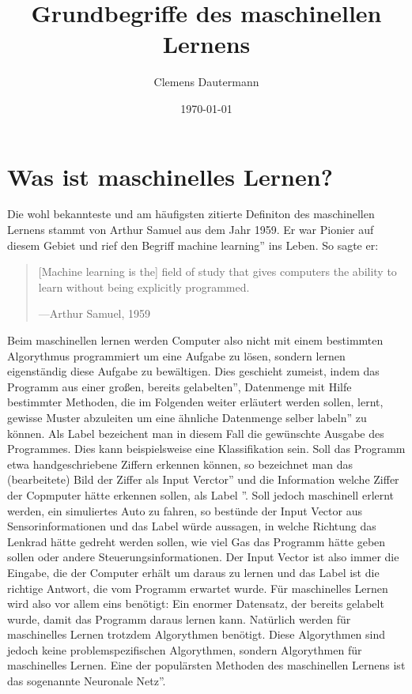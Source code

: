 \documentclass{article}
\author{Clemens Dautermann}
\title{\Huge Grundbegriffe des maschinellen Lernens}
\date{\today{}}
\begin{document}
\biolinum
{}
\begin{titlepage}
	\maketitle
\end{titlepage}
\tableofcontents{}
\newpage

\section{Was ist maschinelles Lernen?}
Die wohl bekannteste und am häufigsten zitierte Definiton des maschinellen Lernens stammt von Arthur Samuel aus dem Jahr 1959. Er war Pionier auf diesem Gebiet und rief den Begriff \glqq machine learning'' ins Leben. So sagte er:
\begin{quote}
	[Machine learning is the] field of study that gives computers the ability to learn without being explicitly programmed\cite{1}.
	\begin{flushright}
		---Arthur Samuel, 1959
	\end{flushright}
\end{quote}
Beim maschinellen lernen werden Computer also nicht mit einem bestimmten Algorythmus programmiert um eine Aufgabe zu lösen, sondern lernen eigenständig diese Aufgabe zu bewältigen. Dies geschieht zumeist, indem das Programm aus einer großen, bereits \glqq gelabelten'', Datenmenge mit Hilfe bestimmter Methoden, die im Folgenden weiter erläutert werden sollen, lernt, gewisse Muster abzuleiten um eine ähnliche Datenmenge selber \glqq labeln'' zu können.  Als Label bezeichent man in diesem Fall die gewünschte Ausgabe des Programmes. Dies kann beispielsweise eine Klassifikation sein. Soll das Programm etwa handgeschriebene Ziffern erkennen können, so bezeichnet man das (bearbeitete) Bild der Ziffer als \glqq Input Verctor'' und die Information welche Ziffer der Copmputer hätte erkennen sollen, als \glqq Label ''. Soll jedoch maschinell erlernt werden, ein simuliertes Auto zu fahren, so bestünde der Input Vector aus Sensorinformationen und das Label würde aussagen, in welche Richtung das Lenkrad hätte gedreht werden sollen, wie viel Gas das Programm hätte geben sollen oder andere Steuerungsinformationen. Der Input Vector ist also immer die Eingabe, die der Computer erhält um daraus zu lernen und das Label ist die richtige Antwort, die vom Programm erwartet wurde. Für maschinelles Lernen wird also vor allem eins benötigt: Ein enormer Datensatz, der bereits gelabelt wurde, damit das Programm daraus lernen kann.\newline
Natürlich werden für maschinelles Lernen trotzdem Algorythmen benötigt. Diese Algorythmen sind jedoch keine problemspezifischen Algorythmen, sondern Algorythmen für maschinelles Lernen. Eine der populärsten Methoden des maschinellen Lernens ist das sogenannte \glqq Neuronale Netz''. 
\end{document}
